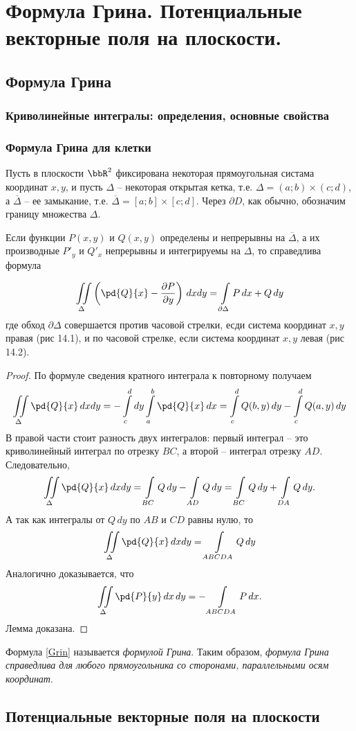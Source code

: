 \chapter{Формула Грина. Потенциальные векторные поля на плоскости.}
\section{Формула Грина} 

\subsection{Криволинейные интегралы: определения, основные свойства}

\subsection{Формула Грина для клетки}

Пусть в плоскости $\bbR^2$ фиксирована некоторая прямоугольная систама координат $x,y$, и пусть $\Delta$ -- некоторая открытая кетка, т.е. $\Delta = (a;b)\times(c;d)$, а $\overline{\Delta}$ -- ее замыкание, т.е. $\overline{\Delta}=[a;b]\times[c;d]$. Через $\partial D$, как обычно, обозначим границу множества $\Delta$.


\begin{lemm}
Если функции $P(x,y)$ и $Q(x,y)$ определены и непрерывны на $\overline{\Delta}$, а их производные $P'_y$ и $Q'_x$ непрерывны и интегрируемы на $\Delta$, то справедлива формула

\begin{equation} \label{Grin}
\iint\limits_{\Delta} \left( \pd{Q}{x}-\frac{\partial P}{\partial y} \right)\,dxdy = \int\limits_{\partial \Delta} P\,dx + Q\,dy
\end{equation}
где обход $\partial\Delta$ совершается против часовой стрелки, есди система координат $x,y$ правая (рис 14.1), и по часовой стрелке, если система координат $x,y$ левая (рис 14.2).
\end{lemm}

\begin{proof}
По формуле сведения кратного интеграла к повторному получаем
$$
\iint\limits_{\Delta} \pd{Q}{x} \,dxdy = -\int_{c}^{d}\limits dy \int_a^b\limits \pd{Q}{x}\,dx = \int_c^d\limits Q(b,y)\,dy - \int_c^d\limits Q(a,y)\,dy
$$
В правой части стоит разность двух интегралов: первый интеграл -- это криволинейный интеграл по отрезку $BC$, а второй -- интеграл отрезку $AD$. Следовательно,
$$
\iint\limits_\Delta\pd{Q}{x}\,dxdy = \int_{BC}\limits Q\,dy - \int_{AD}\limits Q\,dy = \int_{BC}\limits Q\,dy + \int_{DA}\limits Q\,dy.
$$
А так как интегралы от $Q\,dy$ по $AB$ и $CD$ равны нулю, то
$$
\iint\limits_\Delta\pd{Q}{x}\,dxdy = \int\limits_{ABCDA} Q\,dy
$$
Аналогично доказывается, что
$$
\iint\limits_\Delta\pd{P}{y}\,dx\,dy = -\int\limits_{ABCDA} P\,dx.  
$$ 
\noindent
Лемма доказана.
\end{proof}
Формула \eqref{Grin} называется \textit{формулой Грина}. Таким образом, \textit{формула Грина справедлива для любого прямоугольника со сторонами, параллельными осям координат}.


\section{Потенциальные векторные поля на плоскости}